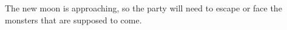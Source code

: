 The new moon is approaching, so the party will need to escape or face the monsters that are supposed to come.
